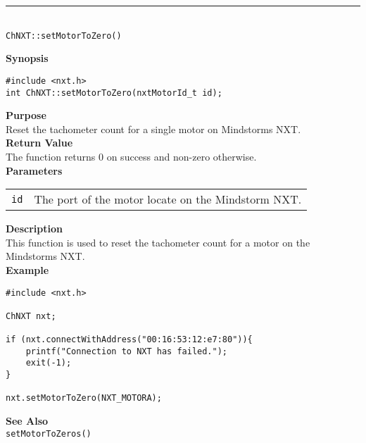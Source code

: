 \noindent
\vspace{5pt}
\rule{4.5in}{0.015in}\\
\noindent
{\LARGE \texttt{ChNXT::setMotorToZero()} }\\


\noindent
{\bf Synopsis}
\begin{lstlisting}
#include <nxt.h>
int ChNXT::setMotorToZero(nxtMotorId_t id);
\end{lstlisting}

\noindent
{\bf Purpose}\\
Reset the tachometer count for a single motor on Mindstorms NXT.\\

\noindent
{\bf Return Value}\\
The function returns 0 on success and non-zero otherwise.\\

\noindent
{\bf Parameters}\\
\vspace{-0.1in}
\begin{description}
\item
\begin{tabular}{p{20mm}p{135mm}}
\texttt{id} &The port of the motor locate on the Mindstorm NXT.\\
\end{tabular}
\end{description}

\noindent
{\bf Description}\\
This function is used to reset the tachometer count for a motor on the Mindstorms NXT.\\

\noindent
{\bf Example}
\begin{lstlisting}
#include <nxt.h> 

ChNXT nxt;

if (nxt.connectWithAddress("00:16:53:12:e7:80")){
    printf("Connection to NXT has failed.");
    exit(-1);
}
    
nxt.setMotorToZero(NXT_MOTORA);
\end{lstlisting}

\noindent
{\bf See Also}\\
\texttt{setMotorToZeros()}\\

